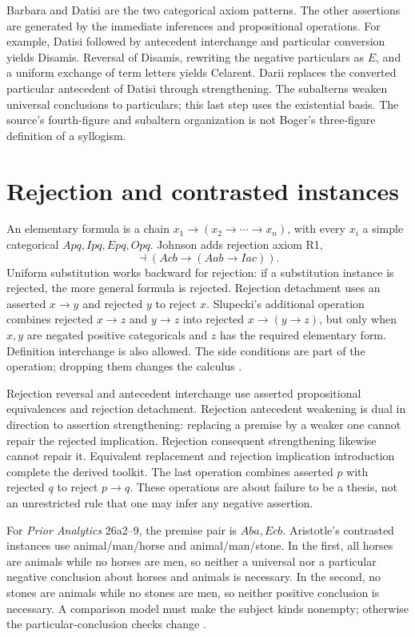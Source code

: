 Barbara and Datisi are the two categorical axiom patterns. The other
assertions are generated by the immediate inferences and propositional
operations. For example, Datisi followed by antecedent interchange and
particular conversion yields Disamis. Reversal of Disamis, rewriting the
negative particulars as \(E\), and a uniform exchange of term letters
yields Celarent. Darii replaces the converted particular antecedent of
Datisi through strengthening. The subalterns weaken universal conclusions
to particulars; this last step uses the existential basis.
The source's fourth-figure and subaltern organization is not Boger's
three-figure definition of a syllogism.

\section{Rejection and contrasted instances}
\label{sec:p13-johnson-rejection}

An elementary formula is a chain
\(x_1\to(x_2\to\cdots\to x_n)\), with every \(x_i\) a simple
categorical \(Apq,Ipq,Epq,Opq\). Johnson adds rejection axiom R1,
\[
 \dashv(Acb\to(Aab\to Iac)).
\]
Uniform substitution works backward for rejection: if a substitution
instance is rejected, the more general formula is rejected.
Rejection detachment uses an asserted \(x\to y\) and rejected \(y\)
to reject \(x\). Slupecki's additional operation combines rejected
\(x\to z\) and \(y\to z\) into rejected \(x\to(y\to z)\), but only
when \(x,y\) are negated positive categoricals and \(z\) has the required
elementary form. Definition interchange is also allowed.
The side conditions are part of the operation; dropping them changes
the calculus \parencite[pp.~252--254]{Johnson2004ModalSyllogisms}.

Rejection reversal and antecedent interchange use asserted propositional
equivalences and rejection detachment. Rejection antecedent weakening is
dual in direction to assertion strengthening: replacing a premise by a
weaker one cannot repair the rejected implication. Rejection consequent
strengthening likewise cannot repair it. Equivalent replacement and
rejection implication introduction complete the derived toolkit.
The last operation combines asserted \(p\) with rejected \(q\) to reject
\(p\to q\). These operations are about failure to be a thesis, not an
unrestricted rule that one may infer any negative assertion.

For \emph{Prior Analytics} 26a2--9, the premise pair is \(Aba,Ecb\).
Aristotle's contrasted instances use animal/man/horse and
animal/man/stone. In the first, all horses are animals while no horses
are men, so neither a universal nor a particular negative conclusion
about horses and animals is necessary. In the second, no stones are
animals while no stones are men, so neither positive conclusion is
necessary. A comparison model must make the subject kinds nonempty;
otherwise the particular-conclusion checks change
\parencite[pp.~255--257]{Johnson2004ModalSyllogisms}.

